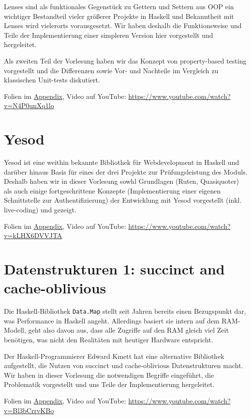 \documentclass[10pt,a4paper]{article}
\begin{document}
Lenses sind als funktionales Gegenstück zu Gettern und Settern aus OOP ein wichtiger Bestandteil vieler größerer Projekte in Haskell und Bekanntheit mit Lenses wird vielerorts vorausgesetzt. Wir haben deshalb die Funktionsweise und Teile der Implementierung einer simpleren Version hier vorgestellt und hergeleitet.
\smallskip\smallskip

Als zweiten Teil der Vorlesung haben wir das Konzept von property-based testing vorgestellt und die Differenzen sowie Vor- und Nachteile im Vergleich zu klassischen Unit-tests diskutiert.

\bigskip
Folien im \hyperref[v7]{Appendix}, Video auf YouTube: \;\url{https://www.youtube.com/watch?v=N4P0unXq1lo}

\section{Yesod}

Yesod ist eine weithin bekannte Bibliothek für Webdevelopment in Haskell und darüber hinaus Basis für eines der drei Projekte zur Prüfungsleistung des Moduls. Deshalb haben wir in dieser Vorlesung sowhl Grundlagen (Ruten, Quasiquoter) als auch einige fortgeschrittene Konzepte (Implementierung einer eigenen Schnittstelle zur Authentifizierung) der Entwicklung mit Yesod vorgestellt (inkl. live-coding) und gezeigt.

\bigskip
Folien im \hyperref[v8]{Appendix}, Video auf YouTube: \;\url{https://www.youtube.com/watch?v=kLHX6DVVJTA}

\section{Datenstrukturen 1: succinct and cache-oblivious}

Die Haskell-Bibliothek \texttt{Data.Map} stellt seit Jahren bereits einen Bezugspunkt dar, was Performance in Haskell angeht. Allerdings basiert sie intern auf dem RAM-Modell, geht also davon aus, dass alle Zugriffe auf den RAM gleich viel Zeit benötigen, was nicht den Realitäten mit heutiger Hardware entspricht.
\smallskip\smallskip

Der Haskell-Programmierer Edward Kmett hat eine alternative Bibliothek aufgestellt, die Nutzen von succinct und cache-oblivious Datenstrukturen macht. Wir haben in dieser Vorlesung die notwendigen Begriffe eingeführt, die Problematik vorgestellt und uns Teile der Implementierung hergeleitet.

\bigskip
Folien im \hyperref[v9]{Appendix}, Video auf YouTube: \;\url{https://www.youtube.com/watch?v=Bl3bCrrvKBo}
\end{document}

